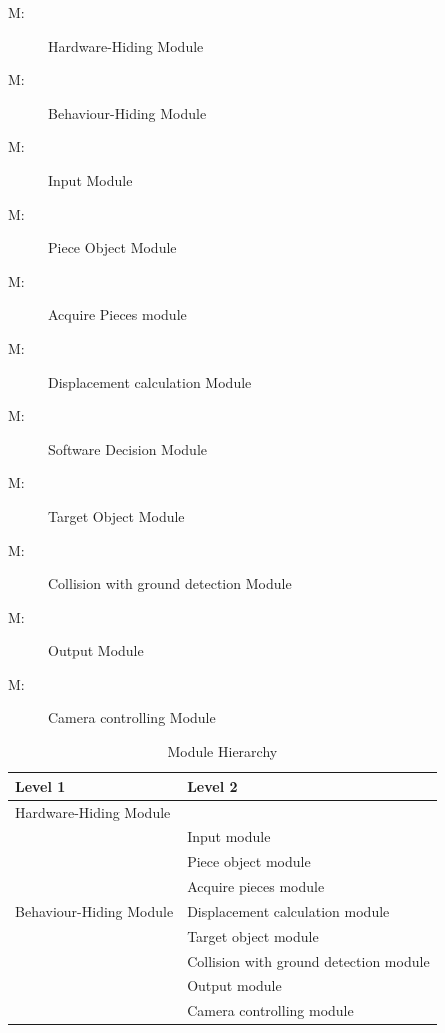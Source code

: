 \documentclass[12pt, titlepage]{article}
\newcounter{mnum}
\newcommand{\mthemnum}{M\themnum}
\begin{document}
	\begin{description}
		\item [ \mthemnum \label{mHH}:] Hardware-Hiding Module
		\item [ \mthemnum \label{mBH}:] Behaviour-Hiding Module
		\item [ \mthemnum \label{mIF}:] Input Module
		\item [ \mthemnum \label{mPO}:] Piece Object Module
		\item [ \mthemnum \label{mOGC}:] Acquire Pieces module
		\item [ \mthemnum \label{mDC1}:] Displacement calculation Module
		\item [ \mthemnum \label{mSD}:] Software Decision Module
		\item [ \mthemnum \label{mTO}:] Target Object Module
		\item [ \mthemnum \label{mOC}:] Collision with ground detection Module
		\item [ \mthemnum \label{mOM}:] Output Module
		\item [ \mthemnum \label{mCC}:] Camera controlling Module
	\end{description}
	
	
	\begin{table}[h!]
		\centering
		\begin{tabular}{p{} p{}}
			\toprule
			\textbf{Level 1} & \textbf{Level 2}\\
			\midrule
			
			{Hardware-Hiding Module} & ~ \\
			\midrule
			
			\multirow{7}{0.3\textwidth}{Behaviour-Hiding Module} & Input module\\			
			& Piece object module\\
			& Acquire pieces module\\
			& Displacement calculation module\\
			\midrule
			
			\multirow{3}{0.3\textwidth}{Software Decision Module} & Target object module\\
			& Collision with ground detection module\\
			& Output module\\
			& Camera controlling module\\
			\bottomrule
			
		\end{tabular}
		\caption{Module Hierarchy}
		\label{TblMH}
	\end{table}
	
\end{document}
